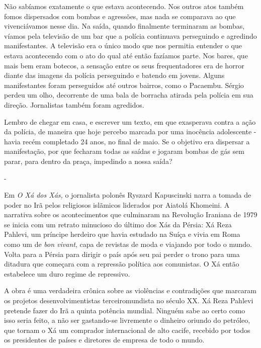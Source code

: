 Não sabíamos exatamente o que estava acontecendo. Nos outros atos também
fomos dispersados com bombas e agressões, mas nada se comparava ao que
vivenciávamos nesse dia. Na saída, quando finalmente terminaram as
bombas, víamos pela televisão de um bar que a polícia continuava
perseguindo e agredindo manifestantes. A televisão era o único modo que
nos permitia entender o que estava acontecendo com o ato do qual até
então fazíamos parte. Nos bares, que mais bem eram botecos, a sensação
entre os seus frequentadores era de horror diante das imagens da polícia
perseguindo e batendo em jovens. Alguns manifestantes foram perseguidos
até outros bairros, como o Pacaembu. Sérgio perdeu um olho, decorrente
de uma bala de borracha atirada pela polícia em sua direção. Jornalistas
também foram agredidos.

Lembro de chegar em casa, e escrever um texto, em que exasperava contra
a ação da polícia, de maneira que hoje percebo marcada por uma inocência
adolescente - havia recém completado 24 anos, no final de maio. Se o
objetivo era dispersar a manifestação, por que fecharam todas as saídas
e jogaram bombas de gás sem parar, para dentro da praça, impedindo a
nossa saída?

-

Em \emph{O Xá dos Xás,} o jornalista polonês Ryszard Kapuscinski narra a
tomada de poder no Irã pelos religiosos islãmicos liderados por Aiatolá
Khomeini. A narrativa sobre os acontecimentos que culminaram na
Revolução Iraniana de 1979 se inicia com um retrato minucioso do último
dos Xás da Pérsia: Xá Reza Pahlevi, um príncipe herdeiro que havia
estudado na Suíça e vivia em Roma como um de \emph{bon vivant}, capa de
revistas de moda e viajando por todo o mundo. Volta para a Pérsia para
dirigir o país após seu pai perder o trono para uma ditadura que
começara com a repressão política aos comunistas. O Xá então estabelece
um duro regime de repressivo.

A obra é uma verdadeira crônica sobre as violências e contradições que
marcaram os projetos desenvolvimentistas terceiromundista no século XX.
Xá Reza Pahlevi pretende fazer do Irã a quinta potência mundial. Ninguém
sabe ao certo como isso seria feito, a não ser gastando-se livremente o
dinheiro oriundo do petróleo, que tornam o Xá um comprador internacional
de alto cacife, recebido por todos os presidentes de países e diretores
de empresa de todo o mundo.

